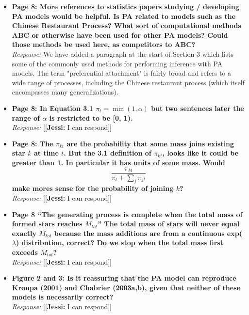 \documentclass[11pt, oneside]{article}   	%
\newcommand{\jessi}[1]{{\color{blue}[[\textbf{Jessi: }#1]]}}
\begin{document}
\begin{itemize}
\item  {\bf Page 8: More references to statistics papers studying / developing PA models would be helpful. Is PA related to models such as the Chinese Restaurant Process? What sort of computational methods ABC or otherwise have been used for other PA models? Could those methods be used here, as competitors to ABC?} \\

\noindent \emph{Response:} We have added a paragraph at the start of Section 3 which lists some of the commonly used
methods for performing inference with PA models. The term "preferential attachment" is fairly broad and refers to
a wide range of processes, including the Chinese restaurant process (which itself encompasses many generalizations).

\bigskip

\item {\bf Page 8: In Equation 3.1 $\pi_t = \min(1,\alpha)$ but two sentences later the range of $\alpha$ is restricted to be [0, 1).} \\

\noindent \emph{Response:} \jessi{I can respond}
\bigskip

\item  {\bf Page 8: The $\pi_{kt}$ are the probability that some mass joins existing star $k$ at time $t$. But the 3.1 definition of $\pi_{kt}$, looks like it could be greater than 1. In particular it has units
of some mass. Would $$\frac{\pi_{kt}}{\pi_t + \sum_j \pi_{jt}}$$
make mores sense for the probability of joining $k$?} \\

\noindent \emph{Response:} \jessi{I can respond}
\bigskip

\item {\bf Page 8 ``The generating process is complete when the total mass of formed stars reaches $M_{tot}$'' The total mass of stars will never equal exactly $M_{tot}$ because the mass additions are from a continuous exp($\lambda$) distribution, correct? Do we stop when the total mass first exceeds $M_{tot}$?}\\

\noindent \emph{Response:} \jessi{I can respond}
\bigskip

\item  {\bf Figure 2 and 3: Is it reassuring that the PA model can reproduce Kroupa (2001) and Chabrier (2003a,b), given that neither of these models is necessarily correct?}\\
\noindent \emph{Response:} \jessi{I can respond}
\bigskip


\end{itemize}
\end{document}

